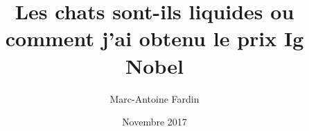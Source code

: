 \title{Les chats sont-ils liquides ou comment j'ai obtenu le prix Ig Nobel}
\author{Marc-Antoine Fardin}
\date{Novembre 2017}


\maketitle
